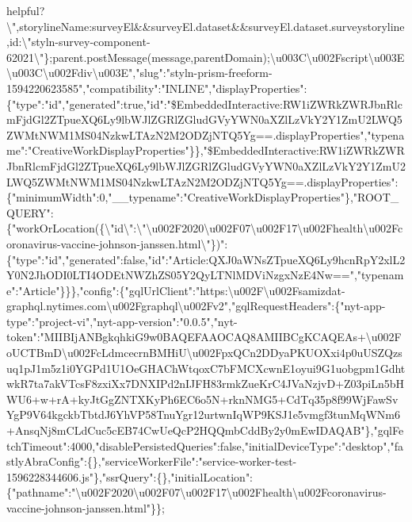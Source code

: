 helpful?\textbackslash{}",storylineName:surveyEl\&\&surveyEl.dataset\&\&surveyEl.dataset.surveystoryline,id:\textbackslash{}"styln-survey-component-62021\textbackslash{}"\};parent.postMessage(message,parentDomain);\textbackslash{}u003C\textbackslash{}u002Fscript\textbackslash{}u003E\textbackslash{}u003C\textbackslash{}u002Fdiv\textbackslash{}u003E","slug":"styln-prism-freeform-1594220623585","compatibility":"INLINE","displayProperties":\{"type":"id","generated":true,"id":"\$EmbeddedInteractive:RW1iZWRkZWRJbnRlcmFjdGl2ZTpueXQ6Ly9lbWJlZGRlZGludGVyYWN0aXZlLzVkY2Y1ZmU2LWQ5ZWMtNWM1MS04NzkwLTAzN2M2ODZjNTQ5Yg==.displayProperties","typename":"CreativeWorkDisplayProperties"\}\},"\$EmbeddedInteractive:RW1iZWRkZWRJbnRlcmFjdGl2ZTpueXQ6Ly9lbWJlZGRlZGludGVyYWN0aXZlLzVkY2Y1ZmU2LWQ5ZWMtNWM1MS04NzkwLTAzN2M2ODZjNTQ5Yg==.displayProperties":\{"minimumWidth":0,"\_\_typename":"CreativeWorkDisplayProperties"\},"ROOT\_QUERY":\{"workOrLocation(\{\textbackslash{}"id\textbackslash{}":\textbackslash{}"\textbackslash{}u002F2020\textbackslash{}u002F07\textbackslash{}u002F17\textbackslash{}u002Fhealth\textbackslash{}u002Fcoronavirus-vaccine-johnson-janssen.html\textbackslash{}"\})":\{"type":"id","generated":false,"id":"Article:QXJ0aWNsZTpueXQ6Ly9hcnRpY2xlL2Y0N2JhODI0LTI4ODEtNWZhZS05Y2QyLTNlMDViNzgxNzE4Nw==","typename":"Article"\}\}\},"config":\{"gqlUrlClient":"https:\textbackslash{}u002F\textbackslash{}u002Fsamizdat-graphql.nytimes.com\textbackslash{}u002Fgraphql\textbackslash{}u002Fv2","gqlRequestHeaders":\{"nyt-app-type":"project-vi","nyt-app-version":"0.0.5","nyt-token":"MIIBIjANBgkqhkiG9w0BAQEFAAOCAQ8AMIIBCgKCAQEAs+\textbackslash{}u002FoUCTBmD\textbackslash{}u002FcLdmcecrnBMHiU\textbackslash{}u002FpxQCn2DDyaPKUOXxi4p0uUSZQzsuq1pJ1m5z1i0YGPd1U1OeGHAChWtqoxC7bFMCXcwnE1oyui9G1uobgpm1GdhtwkR7ta7akVTcsF8zxiXx7DNXIPd2nIJFH83rmkZueKrC4JVaNzjvD+Z03piLn5bHWU6+w+rA+kyJtGgZNTXKyPh6EC6o5N+rknNMG5+CdTq35p8f99WjFawSvYgP9V64kgckbTbtdJ6YhVP58TnuYgr12urtwnIqWP9KSJ1e5vmgf3tunMqWNm6+AnsqNj8mCLdCuc5cEB74CwUeQcP2HQQmbCddBy2y0mEwIDAQAB"\},"gqlFetchTimeout":4000,"disablePersistedQueries":false,"initialDeviceType":"desktop","fastlyAbraConfig":\{\},"serviceWorkerFile":"service-worker-test-1596228344606.js"\},"ssrQuery":\{\},"initialLocation":\{"pathname":"\textbackslash{}u002F2020\textbackslash{}u002F07\textbackslash{}u002F17\textbackslash{}u002Fhealth\textbackslash{}u002Fcoronavirus-vaccine-johnson-janssen.html"\}\};
